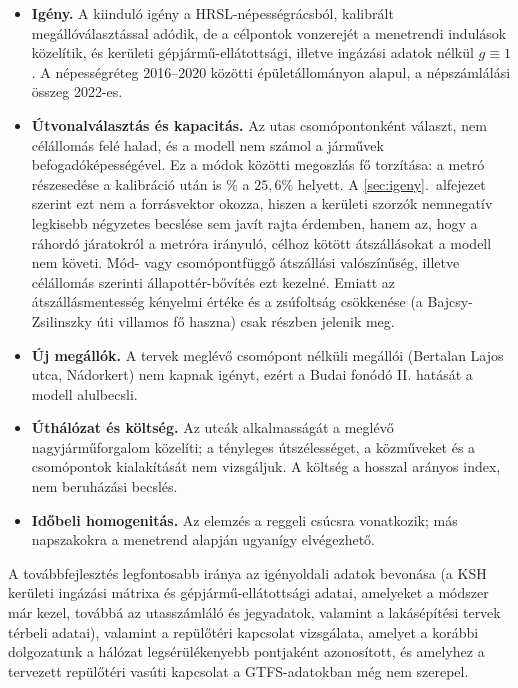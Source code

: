 \documentclass[12pt,a4paper]{article}
\theoremstyle{definition}
\theoremstyle{remark}
\begin{document}
\begin{itemize}
  \item \textbf{Igény.} A kiinduló igény a HRSL-népességrácsból,
    kalibrált megállóválasztással adódik, de a célpontok vonzerejét a
    menetrendi indulások közelítik, és kerületi gépjármű-ellátottsági,
    illetve ingázási adatok nélkül $g\equiv1$. A népességréteg 2016--2020
    közötti épületállományon alapul, a népszámlálási összeg 2022-es.
  \item \textbf{Útvonalválasztás és kapacitás.} Az utas csomópontonként
    választ, nem célállomás felé halad, és a modell nem számol a járművek
    befogadóképességével. Ez a módok közötti megoszlás fő torzítása: a metró
    részesedése a kalibráció után is \MSBMETRO\% a $25{,}6\%$ helyett. A
    \ref{sec:igeny}.~alfejezet szerint ezt nem a forrásvektor okozza, hiszen
    a kerületi szorzók nemnegatív legkisebb négyzetes becslése sem javít
    rajta érdemben, hanem az, hogy a ráhordó járatokról a metróra irányuló,
    célhoz kötött átszállásokat a modell nem követi. Mód- vagy
    csomópontfüggő átszállási valószínűség, illetve célállomás szerinti
    állapottér-bővítés ezt kezelné. Emiatt az átszállásmentesség kényelmi értéke és a
    zsúfoltság csökkenése (a Bajcsy-Zsilinszky úti villamos fő haszna) csak
    részben jelenik meg.
  \item \textbf{Új megállók.} A tervek meglévő csomópont nélküli megállói
    (Bertalan Lajos utca, Nádorkert) nem kapnak igényt, ezért a Budai fonódó
    II. hatását a modell alulbecsli.
  \item \textbf{Úthálózat és költség.} Az utcák alkalmasságát a meglévő
    nagyjárműforgalom közelíti; a tényleges útszélességet, a közműveket és a
    csomópontok kialakítását nem vizsgáljuk. A költség a hosszal arányos
    index, nem beruházási becslés.
  \item \textbf{Időbeli homogenitás.} Az elemzés a reggeli csúcsra
    vonatkozik; más napszakokra a menetrend alapján ugyanígy elvégezhető.
\end{itemize}

A továbbfejlesztés legfontosabb iránya az igényoldali adatok bevonása
(a KSH kerületi ingázási mátrixa és gépjármű-ellátottsági adatai, amelyeket
a módszer már kezel, továbbá az utasszámláló és jegyadatok, valamint a
lakásépítési tervek térbeli adatai), valamint a
repülőtéri kapcsolat vizsgálata, amelyet a korábbi dolgozatunk a hálózat
legsérülékenyebb pontjaként azonosított, és amelyhez a tervezett repülőtéri
vasúti kapcsolat a GTFS-adatokban még nem szerepel.
\end{document}
